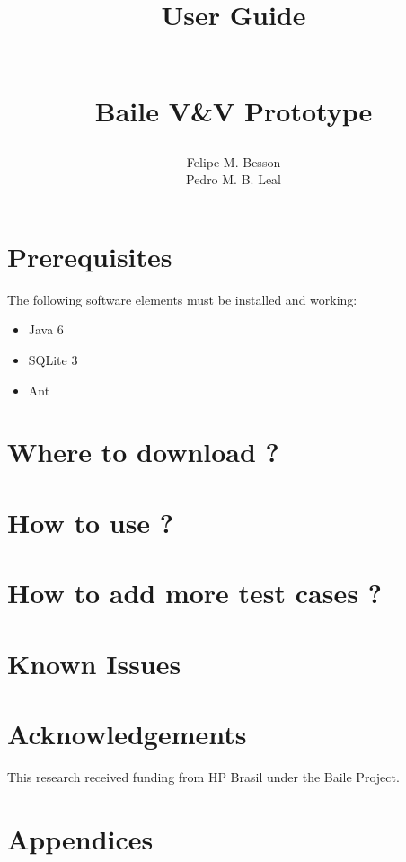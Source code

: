 \documentclass{article}	%
\author{Felipe M. Besson \\ Pedro M. B. Leal}
\title{\begin{huge}\textbf{User Guide}\end{huge} \\ Baile V\&V Prototype}
\begin{document}
\maketitle			%

\date 


\newpage

\section{ Prerequisites}
The following software elements must be installed and working:

\begin{itemize}
 \item Java 6~\cite{java6}
 \item SQLite 3~\cite{sql3}
 \item Ant~\cite{ant}
\end{itemize}

\section{ Where to download ? }

\section{ How to use ? }

\section{ How to add more test cases ? }

\section{ Known Issues }

\section{Acknowledgements}
This research received funding from HP Brasil under the Baile Project.

\section{Appendices}


\newpage

\end{document}
